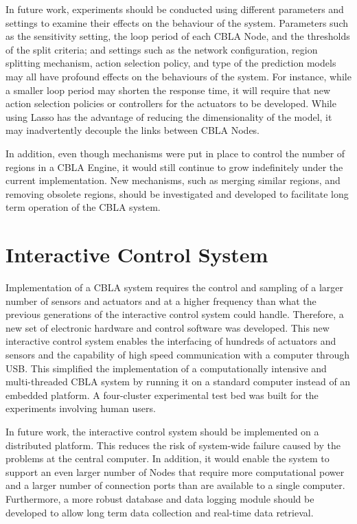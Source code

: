 In future work, experiments should be conducted using different parameters and settings to examine their effects on the behaviour of the system. Parameters such as the sensitivity setting, the loop period of each CBLA Node, and the thresholds of the split criteria; and settings such as the network configuration, region splitting mechanism, action selection policy, and type of the prediction models may all have profound effects on the behaviours of the system. For instance, while a smaller loop period may shorten the response time, it will require that new action selection policies or controllers for the actuators to be developed. While using Lasso has the advantage of reducing the dimensionality of the model, it may inadvertently decouple the links between CBLA Nodes. 

In addition, even though mechanisms were put in place to control the number of regions in a CBLA Engine, it would still continue to grow indefinitely under the current implementation. New mechanisms, such as merging similar regions, and removing obsolete regions, should be investigated and developed to facilitate long term operation of the CBLA system.


\section{Interactive Control System}
Implementation of a CBLA system requires the control and sampling of a larger number of sensors and actuators and at a higher frequency than what the previous generations of the interactive control system could handle. Therefore, a new set of electronic hardware and control software was developed. This new interactive control system enables the interfacing of hundreds of actuators and sensors and the capability of high speed communication with a computer through USB. This simplified the implementation of a computationally intensive and multi-threaded CBLA system by running it on a standard computer instead of an embedded platform. A four-cluster experimental test bed was built for the experiments involving human users.

In future work, the interactive control system should be implemented on a distributed platform. This reduces the risk of system-wide failure caused by the problems at the central computer. In addition, it would enable the system to support an even larger number of Nodes that require more computational power and a larger number of connection ports than are available to a single computer. Furthermore, a more robust database and data logging module should be developed to allow long term data collection and real-time data retrieval. 


